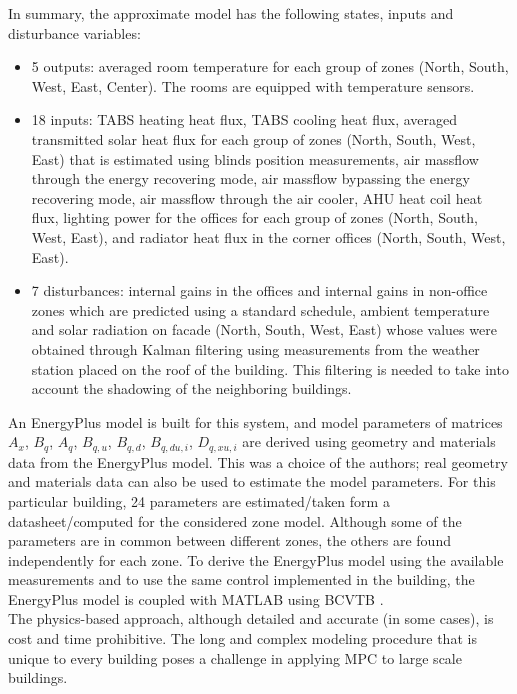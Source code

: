 	In summary, the approximate model has the following states, inputs and disturbance variables:
	\begin{itemize}
		\item 5 outputs: averaged room temperature for each group of zones (North, South, West, East, Center). The rooms are equipped with temperature sensors.
		\item 18 inputs: TABS heating heat flux, TABS cooling heat flux, averaged transmitted solar heat flux for each group of zones (North, South, West, East) that is estimated using blinds position measurements, air massflow through the energy recovering mode, air massflow bypassing the energy recovering mode, air massflow through the air cooler, AHU heat coil heat flux, lighting power for the offices for each group of zones (North, South, West, East), and radiator heat flux in the corner offices (North, South, West, East).
		\item 7 disturbances: internal gains in the offices and internal gains in non-office zones which are predicted using a standard schedule, ambient temperature and solar radiation on facade (North, South, West, East) whose values were obtained through Kalman filtering using measurements from the weather station placed on the roof of the building. This filtering is needed to take into account the shadowing of the neighboring buildings.
	\end{itemize}
An EnergyPlus model is built for this system, and model parameters of matrices $A_x$, $B_q$, $A_q$, $B_{q,u}$, $B_{q,d}$, $B_{q,du,i}$, $D_{q,xu,i}$ are derived using geometry and materials data from the EnergyPlus model.
This was a choice of the authors; real geometry and materials data can also be used to estimate the model parameters. 
For this particular building, 24 parameters are estimated/taken form a datasheet/computed for the considered zone model.
Although some of the parameters are in common between different zones, the others are found independently for each zone.
To derive the EnergyPlus model using the available measurements and to use the same control implemented in the building, the EnergyPlus model is coupled with MATLAB using BCVTB \cite{Wetter2015}. 
\\

The physics-based approach, although detailed and accurate (in some cases), is cost and time prohibitive. The long and complex modeling procedure that is unique to every building poses a challenge in applying MPC to large scale buildings.


